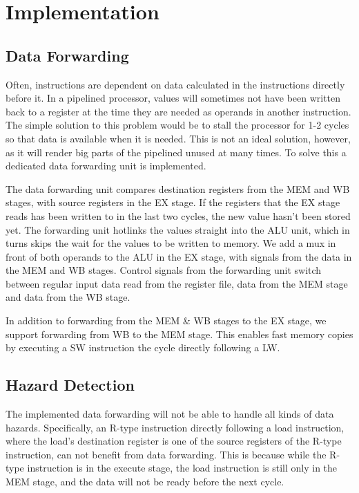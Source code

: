 \section{Implementation}

\subsection{Data Forwarding}
Often, instructions are dependent on data calculated in the instructions directly before it.
In a pipelined processor, values will sometimes not have been written back to a register at the time they are needed as operands in another instruction.
The simple solution to this problem would be to stall the processor for 1-2 cycles so that data is available when it is needed.
This is not an ideal solution, however, as it will render big parts of the pipelined unused at many times.
To solve this a dedicated data forwarding unit is implemented.

The data forwarding unit compares destination registers from the MEM and WB stages, with source registers in the EX stage.
If the registers that the EX stage reads has been written to in the last two cycles, the new value hasn't been stored yet.
The forwarding unit hotlinks the values straight into the ALU unit, which in turns skips the wait for the values to be written to memory.
We add a mux in front of both operands to the ALU in the EX stage, with signals from the data in the MEM and WB stages.
Control signals from the forwarding unit switch between regular input data read from the register file, data from the MEM stage and data from the WB stage.

In addition to forwarding from the MEM \& WB stages to the EX stage, we support forwarding from WB to the MEM stage.
This enables fast memory copies by executing a SW instruction the cycle directly following a LW.

\subsection {Hazard Detection}
The implemented data forwarding will not be able to handle all kinds of data hazards.
Specifically, an R-type instruction directly following a load instruction, where the load's destination register is one of the source registers of the R-type instruction, can not benefit from data forwarding.
This is because while the R-type instruction is in the execute stage, the load instruction is still only in the MEM stage, and the data will not be ready before the next cycle.

